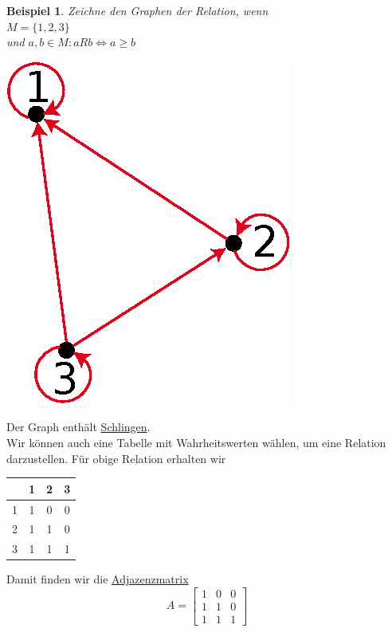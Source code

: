 \documentclass{report}
\newtheorem{myexample}{Beispiel}
\begin{document}
\begin{myexample}Zeichne den Graphen der Relation, wenn\\
$M = \{1, 2, 3\}$\\
und $a,b \in M: a R b \iff a \geq b$
\begin{center}\includegraphics[scale=0.25]{img/3-r-as-graph-example-3.eps}\end{center}
\end{myexample}
Der Graph enthält \underline{Schlingen}.\\
Wir können auch eine Tabelle mit Wahrheitswerten wählen, um eine Relation darzustellen. Für obige Relation erhalten wir
\begin{center}\begin{tabular}{c | c | c | c |}
& 1 & 2 & 3\\ \hline
1 & 1 & 0 & 0\\ \hline
2 & 1 & 1 & 0\\ \hline
3 & 1 & 1 & 1\\ \hline\end{tabular}\end{center}
Damit finden wir die \underline{Adjazenzmatrix}
\begin{equation}A = \left[\begin{array}{rrr}
1 & 0 & 0 \\
1 & 1 & 0 \\
1 & 1 & 1\end{array}\right]\end{equation}
\end{document}
